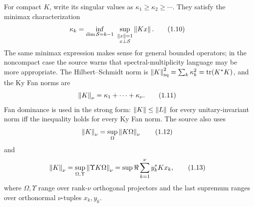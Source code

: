 For compact $K$, write its singular values as $\kappa_1\ge\kappa_2\ge\cdots$.  They satisfy the minimax characterization
\begin{equation}
 \kappa_k=\inf_{\dim\mathcal S=k-1}\ \sup_{\substack{\norm{x}=1\\x\perp\mathcal S}}\norm{Kx}.
 \tag{1.10}
\end{equation}
The same minimax expression makes sense for general bounded operators; in the noncompact case the source warns that spectral-multiplicity language may be more appropriate.  The Hilbert--Schmidt norm is $\left\lVert K\right\rVert_{\mathrm{sq}}^2=\sum_k\kappa_k^2=\operatorname{tr}(K^*K)$, and the Ky Fan norms are
\begin{equation}
 \left\lVert K\right\rVert_\nu=\kappa_1+\cdots+\kappa_\nu.
 \tag{1.11}
\end{equation}
Fan dominance is used in the strong form: $\left\lVert K\right\rVert\le\left\lVert L\right\rVert$ for every unitary-invariant norm iff the inequality holds for every Ky Fan norm.  The source also uses
\begin{equation}
 \left\lVert K\right\rVert_\nu=\sup_{\Omega}\left\lVert K\Omega\right\rVert_\nu
 \tag{1.12}
\end{equation}
and
\begin{equation}
 \left\lVert K\right\rVert_\nu
 =\sup_{\Omega,\Upsilon}\left\lVert \Upsilon K\Omega\right\rVert_\nu
 =\sup\Re\sum_{k=1}^{\nu}y_k^*Kx_k,
 \tag{1.13}
\end{equation}
where $\Omega,\Upsilon$ range over rank-$\nu$ orthogonal projectors and the last supremum ranges over orthonormal $\nu$-tuples $x_k,y_k$.

